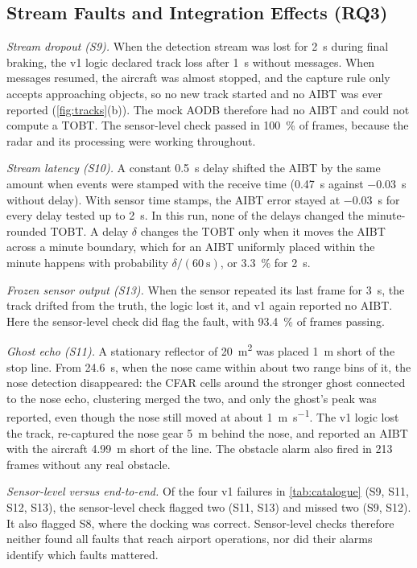 \documentclass[conference]{IEEEtran}
\begin{document}
\subsection{Stream Faults and Integration Effects (RQ3)}
\emph{Stream dropout (S9).} When the detection stream was lost for \SI{2}{\second} during final braking, the v1 logic declared track loss after \SI{1}{\second} without messages. When messages resumed, the aircraft was almost stopped, and the capture rule only accepts approaching objects, so no new track started and no AIBT was ever reported (\cref{fig:tracks}(b)). The mock AODB therefore had no AIBT and could not compute a TOBT. The sensor-level check passed in \SI{100}{\percent} of frames, because the radar and its processing were working throughout.

\emph{Stream latency (S10).} A constant \SI{0.5}{\second} delay shifted the AIBT by the same amount when events were stamped with the receive time (\SI{+0.47}{\second} against \SI{-0.03}{\second} without delay). With sensor time stamps, the AIBT error stayed at \SI{-0.03}{\second} for every delay tested up to \SI{2}{\second}. In this run, none of the delays changed the minute-rounded TOBT. A delay $\delta$ changes the TOBT only when it moves the AIBT across a minute boundary, which for an AIBT uniformly placed within the minute happens with probability $\delta/(\SI{60}{\second})$, or \SI{3.3}{\percent} for \SI{2}{\second}.

\emph{Frozen sensor output (S13).} When the sensor repeated its last frame for \SI{3}{\second}, the track drifted from the truth, the logic lost it, and v1 again reported no AIBT. Here the sensor-level check did flag the fault, with \SI{93.4}{\percent} of frames passing.

\emph{Ghost echo (S11).} A stationary reflector of \SI{20}{\square\metre} was placed \SI{1}{\metre} short of the stop line. From \SI{24.6}{\second}, when the nose came within about two range bins of it, the nose detection disappeared: the CFAR cells around the stronger ghost connected to the nose echo, clustering merged the two, and only the ghost's peak was reported, even though the nose still moved at about \SI{1}{\metre\per\second}. The v1 logic lost the track, re-captured the nose gear \SI{5}{\metre} behind the nose, and reported an AIBT with the aircraft \SI{4.99}{\metre} short of the line. The obstacle alarm also fired in 213 frames without any real obstacle.

\emph{Sensor-level versus end-to-end.} Of the four v1 failures in \cref{tab:catalogue} (S9, S11, S12, S13), the sensor-level check flagged two (S11, S13) and missed two (S9, S12). It also flagged S8, where the docking was correct. Sensor-level checks therefore neither found all faults that reach airport operations, nor did their alarms identify which faults mattered.
\end{document}
